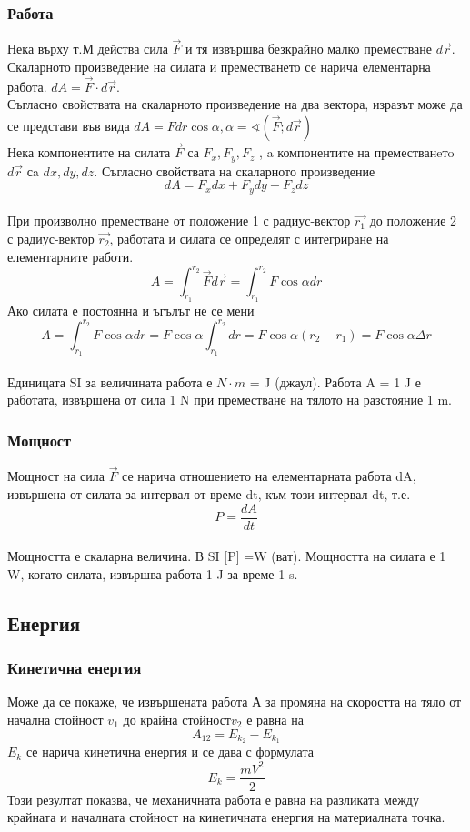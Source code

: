 \documentclass[fleqn, 12pt]{article}
\theoremstyle{definition}
\begin{document}
\subsubsection{Работа}
Нека върху т.М действа сила $\vec{F}$ и тя извършва безкрайно малко преместване $d \vec{r}$. Скаларното произведение на силата и преместването се нарича елементарна работа. $dA = \vec{F} \cdot d \vec{r}$. \\
Съгласно свойствата на скаларното произведение на два вектора, изразът може да се представи във вида $dA = Fdr\cos{\alpha}, \alpha = \sphericalangle ( \vec{F};d \vec{r}) $ \\
Нека компонентите на силата $\vec{F}$ са $F_x , F_y, F_z$ , a компонентите на преместванeтo $d\vec{r}$ сa $dx , dy , dz$. Съгласно свойствата на скаларното произведение 
$$dA = F_xdx + F_ydy + F_zdz$$
\\
При произволно преместване от положение 1 с радиус-вектор $\vec{r_1}$ до положение 2 с радиус-вектор $\vec{r_2}$, работата и силата се определят с интегриране на елементарните работи. 
$$A = \int_{r_1} ^{r_2} \vec{F} d\vec{r} = \int_{r_1} ^{r_2} F \cos{\alpha} dr$$
Ако силата е постоянна и ъгълът не се мени
$$A = \int_{r_1} ^{r_2} F \cos{\alpha} dr = F \cos{\alpha} \int_{r_1} ^{r_2} dr =  F \cos{\alpha} (r_2 - r_1) =  F \cos{\alpha} \Delta r$$ 
\\
Единицата SI за величината работа е $N \cdot m$ = J (джаул). Работа A = 1 J е работата, извършена от сила 1 N при преместване на тялото на разстояние 1 m.

\subsubsection{Мощност}
Мощност на сила $\vec{F}$ се нарича отношението на елементарната работа dA, извършена от силата за интервал от време dt, към този интервал dt, т.е.
$$P = \dfrac{dA}{dt}$$
\\
Мощността е скаларна величина. В SI [P] =W (ват). Мощността на силата е 1 W, когато силата, извършва работа 1 J за време 1 s. 

\subsection{Енергия}

\subsubsection{Кинетична енергия}
Може да се покаже, че извършената работа А за промяна на скоростта на тяло от начална стойност $v_1$ до крайна стойност$v_2$ е равна на 
$$A_{12} = E_{k_2} - E_{k_1} $$
$E_k$ се нарича кинетична енергия и се дава с формулата 
$$E_k = \dfrac{mV^2}{2}$$
Този резултат показва, че механичната работа е равна на разликата между крайната и началната стойност на кинетичната енергия на материалната точка. 
\end{document}
